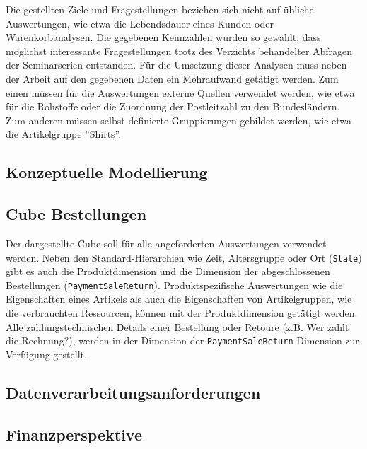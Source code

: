 Die gestellten Ziele und Fragestellungen beziehen sich nicht auf übliche Auswertungen, wie etwa die Lebendsdauer eines Kunden oder Warenkorbanalysen.
Die gegebenen Kennzahlen wurden so gewählt, dass möglichst interessante Fragestellungen trotz des Verzichts behandelter Abfragen der Seminarserien entstanden.
Für die Umsetzung dieser Analysen muss neben der Arbeit auf den gegebenen Daten ein Mehraufwand getätigt werden.
Zum einen müssen für die Auswertungen externe Quellen verwendet werden, wie etwa für die Rohstoffe oder die Zuordnung der Postleitzahl zu den Bundesländern. 
Zum anderen müssen selbst definierte Gruppierungen gebildet werden, wie etwa die Artikelgruppe ''Shirts''.

\pagebreak
\subsection{Konzeptuelle Modellierung}
\label{ref:modellierung}
\subsection*{Cube Bestellungen}
\begin{figure}[htbp] 
  \centering
    
    \caption*{}
\end{figure}

\vspace{11cm}

Der dargestellte Cube soll für alle angeforderten Auswertungen verwendet werden. 
Neben den Standard-Hierarchien wie Zeit, Altersgruppe oder Ort (\texttt{State}) gibt es auch die Produktdimension und die Dimension der abgeschlossenen Bestellungen (\texttt{PaymentSaleReturn}). 
Produktspezifische Auswertungen wie die Eigenschaften eines Artikels als auch die Eigenschaften von Artikelgruppen, wie die verbrauchten Ressourcen, können mit der Produktdimension getätigt werden. 
Alle zahlungstechnischen Details einer Bestellung oder Retoure (z.B. Wer zahlt die Rechnung?), werden in der Dimension der \texttt{PaymentSaleReturn}-Dimension zur Verfügung gestellt.

\subsection{Datenverarbeitungsanforderungen}
\label{ref:businessSicht}
\subsection*{Finanzperspektive}

